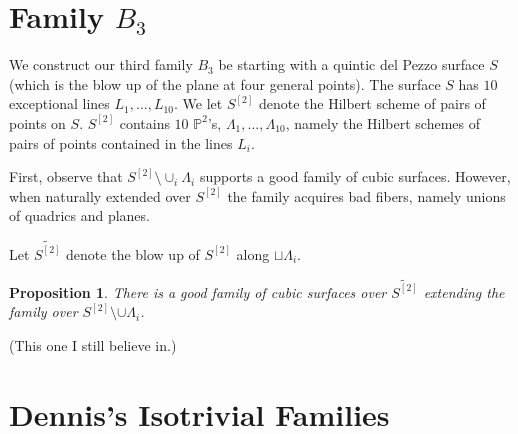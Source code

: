 \documentclass{article}
\newtheorem{proposition}{Proposition}[section]
\renewcommand{\P}{\mathbb{P}}
\newcommand{\<}{\left\langle}
\renewcommand{\>}{\right\rangle}
\begin{document}
\section{Family $B_3$}
\label{sec:family-b_3}

We construct our third family $B_3$ be starting with a quintic del
Pezzo surface $S$ (which is the blow up of the plane at four general
points).  The surface $S$ has $10$ exceptional lines
$L_{1}, \dots, L_{10}$.  We let $S^{[2]}$ denote the Hilbert scheme of
pairs of points on $S$.  $S^{[2]}$ contains $10$ $\P^{2}$'s,
$\Lambda_1, \dots, \Lambda_{10}$, namely the Hilbert schemes of pairs
of points contained in the lines $L_{i}$.

First, observe that $S^{[2]} \setminus \cup_{i}\Lambda_{i}$ supports a
good family of cubic surfaces.  However, when naturally extended over
$S^{[2]}$ the family acquires bad fibers, namely unions of quadrics
and planes.

Let $\widetilde{S^{[2]}}$ denote the blow up of $S^{[2]}$ along
$\sqcup \Lambda_{i}$.

\begin{proposition}
  \label{proposition:resolv-b3}
  There is a good family of cubic surfaces over $\widetilde{S^{[2]}}$
  extending the family over $S^{[2]} \setminus \cup \Lambda_{i}$.
\end{proposition}

(This one I still believe in.)

\section{Dennis's Isotrivial Families}
\label{sec:denn-isotr-famil}




%
%
\end{document}
